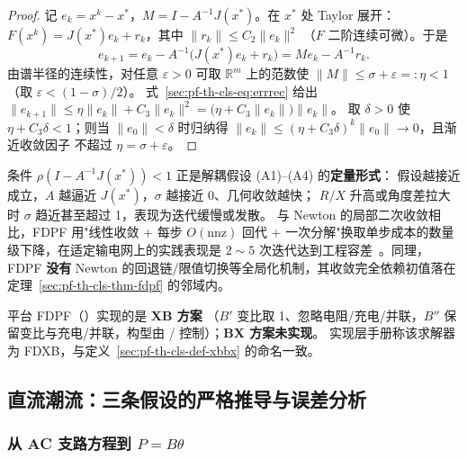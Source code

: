\begin{proof}
记 $e_k=x^k-x^*$，$M=I-A^{-1}J(x^*)$。在 $x^*$ 处 Taylor 展开：
$F(x^k)=J(x^*)e_k+r_k$，其中 $\lVert r_k\rVert\le C_2\lVert e_k\rVert^2$
（$F$ 二阶连续可微）。于是
\begin{equation}
e_{k+1}=e_k-A^{-1}\bigl(J(x^*)e_k+r_k\bigr)=Me_k-A^{-1}r_k.
\label{sec:pf-th-cls-eq:errrec}
\end{equation}
由谱半径的连续性，对任意 $\varepsilon>0$ 可取 $\mathbb R^m$ 上的范数使
$\lVert M\rVert\le\sigma+\varepsilon=:\eta<1$（取 $\varepsilon<(1-\sigma)/2$）。
式~\eqref{sec:pf-th-cls-eq:errrec} 给出
$\lVert e_{k+1}\rVert\le\eta\lVert e_k\rVert+C_3\lVert e_k\rVert^2
=\bigl(\eta+C_3\lVert e_k\rVert\bigr)\lVert e_k\rVert$。
取 $\delta>0$ 使 $\eta+C_3\delta<1$；则当 $\lVert e_0\rVert<\delta$ 时归纳得
$\lVert e_k\rVert\le(\eta+C_3\delta)^k\lVert e_0\rVert\to0$，且渐近收敛因子
不超过 $\eta=\sigma+\varepsilon$。
\end{proof}

\begin{remark}\label{sec:pf-th-cls-rem-fdpfcond}
条件 $\rho(I-A^{-1}J(x^*))<1$ 正是解耦假设 (A1)--(A4) 的\textbf{定量形式}：
假设越接近成立，$A$ 越逼近 $J(x^*)$，$\sigma$ 越接近 $0$、几何收敛越快；
$R/X$ 升高或角度差拉大时 $\sigma$ 趋近甚至超过 1，表现为迭代缓慢或发散。
与 Newton 的局部二次收敛相比，FDPF 用"线性收敛 + 每步 $O(\mathrm{nnz})$
回代 + 一次分解"换取单步成本的数量级下降，在适定输电网上的实践表现是
$2\sim5$ 次迭代达到工程容差~\cite{cls:stott,cls:monticelli}。同理，FDPF
\textbf{没有} Newton 的回退链/限值切换等全局化机制，其收敛完全依赖初值落在
定理~\ref{sec:pf-th-cls-thm-fdpf} 的邻域内。
\end{remark}

\begin{gapnote}
平台 FDPF（）实现的是 \textbf{XB 方案}
（$B'$ 变比取 1、忽略电阻/充电/并联，$B''$ 保留变比与充电/并联，构型由
/ 控制）；\textbf{BX 方案未实现}。
实现层手册称该求解器为 FDXB，与定义~\ref{sec:pf-th-cls-def-xbbx} 的命名一致。
\end{gapnote}

\subsection{直流潮流：三条假设的严格推导与误差分析}\label{sec:pf-th-cls-dc}

\subsubsection{从 AC 支路方程到 $P=B\theta$}


